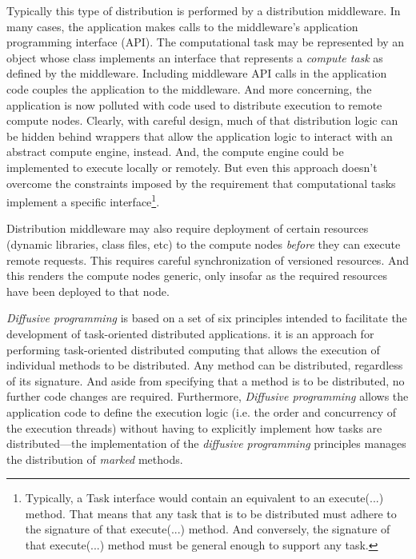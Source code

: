 \documentclass[11pt]{scrartcl}
\begin{document}
Typically this type of distribution is performed by a distribution middleware. In many cases, the application makes calls to the middleware's application programming interface (API). The computational task may be represented by an object whose class implements an interface that represents a \emph{compute task} as defined by the middleware. Including middleware API calls in the application code couples the application to the middleware. And more concerning, the application is now polluted with code used to distribute execution to remote compute nodes. Clearly, with careful design, much of that distribution logic can be hidden behind wrappers that allow the application logic to interact with an abstract compute engine, instead. And, the compute engine could be implemented to execute locally or remotely. But even this approach doesn't overcome the constraints imposed by the requirement that computational tasks implement a specific interface\footnote{Typically, a \textsf{Task} interface would contain an equivalent to an \textsf{execute(...)} method. That means that any task that is to be distributed must adhere to the signature of that \textsf{execute(...)} method. And conversely, the signature of that \textsf{execute(...)} method must be general enough to support any task.}.

Distribution middleware may also require deployment of certain resources (dynamic libraries, class files, etc) to the compute nodes \emph{before} they can execute remote requests. This requires careful synchronization of versioned resources. And this renders the compute nodes generic, only insofar as the required resources have been deployed to that node.

\emph{Diffusive programming} is based on a set of six principles intended to facilitate the development of task-oriented distributed applications. it is an approach for performing task-oriented distributed computing that allows the execution of individual methods to be distributed. Any method can be distributed, regardless of its signature. And aside from specifying that a method is to be distributed, no further code changes are required. Furthermore, \emph{Diffusive programming} allows the application code to define the execution logic (i.e. the order and concurrency of the execution threads) without having to explicitly implement how tasks are distributed---the implementation of the \emph{diffusive programming} principles manages the distribution of \emph{marked} methods.
\end{document}
